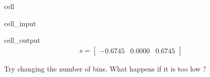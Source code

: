 \documentclass[letterpaper,10pt,english]{jupyterBook}
\begin{document}
\begin{sphinxuseclass}{cell}\begin{sphinxVerbatimInput}

\begin{sphinxuseclass}{cell_input}
\begin{sphinxVerbatim}[commandchars=\\\{\}]
\PYG{p}{[} \PYG{p}{]}
 \PYG{p}{[}  \PYG{p}{]}  
\end{sphinxVerbatim}

\end{sphinxuseclass}\end{sphinxVerbatimInput}
\begin{sphinxVerbatimOutput}

\begin{sphinxuseclass}{cell_output}\begin{equation*}
\begin{split}\displaystyle s=\left[
\begin{array}{}
 -0.6745 &  0.0000 &  0.6745
\end{array}
\right]\end{split}
\end{equation*}
\end{sphinxuseclass}\end{sphinxVerbatimOutput}

\end{sphinxuseclass}
\begin{sphinxShadowBox}
\sphinxstylesidebartitle{}

\sphinxAtStartPar
Try changing the number of bins. What happens if it is too low ?
\end{sphinxShadowBox}
\end{document}
